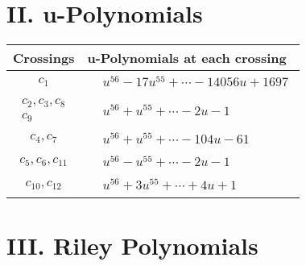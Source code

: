 \documentclass[1p]{elsarticle_modified}
\theoremstyle{definition}
\begin{document}
\newpage\renewcommand{\arraystretch}{1}
\centering \section*{ II. u-Polynomials}
\begin{tabular}{m{50pt}|m{274pt}}
Crossings & \hspace{64pt}u-Polynomials at each crossing \\
\hline $$\begin{aligned}c_{1}\end{aligned}$$&$\begin{aligned}
&u^{56}-17 u^{55}+\cdots-14056 u+1697
\end{aligned}$\\
\hline $$\begin{aligned}c_{2},c_{3},c_{8}\\c_{9}\end{aligned}$$&$\begin{aligned}
&u^{56}+u^{55}+\cdots-2 u-1
\end{aligned}$\\
\hline $$\begin{aligned}c_{4},c_{7}\end{aligned}$$&$\begin{aligned}
&u^{56}+u^{55}+\cdots-104 u-61
\end{aligned}$\\
\hline $$\begin{aligned}c_{5},c_{6},c_{11}\end{aligned}$$&$\begin{aligned}
&u^{56}- u^{55}+\cdots-2 u-1
\end{aligned}$\\
\hline $$\begin{aligned}c_{10},c_{12}\end{aligned}$$&$\begin{aligned}
&u^{56}+3 u^{55}+\cdots+4 u+1
\end{aligned}$\\
\hline
\end{tabular}\newpage\renewcommand{\arraystretch}{1}
\centering \section*{ III. Riley Polynomials}
\end{document}
